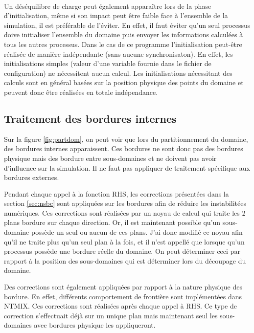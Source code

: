 \paragraph{}Un déséquilibre de charge peut également apparaître lors de la phase d'initialisation, même si son impact peut être faible face à l'ensemble de la simulation, il est préférable de l'éviter. En effet, il faut éviter qu'un seul processus doive initialiser l'ensemble du domaine puis envoyer les informations calculées à tous les autres processus. Dans le cas de ce programme l'initialisation peut-être réalisée de manière indépendante (sans aucune synchronisaton). En effet, les initialisations simples (valeur d'une variable fournie dans le fichier de configuration) ne nécessitent aucun calcul. Les initialisations nécessitant des calculs sont en général basées sur la position physique des points du domaine et peuvent donc être réalisées en totale indépendance.


\subsection{Traitement des bordures internes}
Sur la figure \ref{fig:partdom}, on peut voir que lors du partitionnement du domaine, des bordures internes apparaissent. Ces bordures ne sont donc pas des bordures physique mais des bordure entre sous-domaines et ne doivent pas avoir d'influence sur la simulation. Il ne faut pas appliquer de traitement spécifique aux bordures externes.

Pendant chaque appel à la fonction RHS, les corrections présentées dans la section \ref{sec:nsbc} sont appliquées sur les bordures afin de réduire les instabilitées numériques. Ces corrections sont réalisées par un noyau de calcul qui traite les 2 plans bordure sur chaque direction. Or, il est maintenant possible qu'un sous-domaine possède un seul ou aucun de ces plans. J'ai donc modifié ce noyau afin qu'il ne traite plus qu'un seul plan à la fois, et il n'est appellé que lorsque qu'un processus possède une bordure réelle du domaine. On peut déterminer ceci par rapport à la position des sous-domaines qui est déterminer lors du découpage du domaine.

Des corrections sont également appliquées par rapport à la nature physique des bordure. En effet, différents comportement de frontière sont implémentées dans NTMIX. Ces corrections sont réalisées après chaque appel à RHS. Ce type de correction s'effectuait déjà sur un unique plan mais maintenant seul les sous-domaines avec bordures physique les appliqueront.

